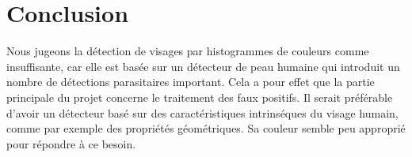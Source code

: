 \documentclass[a4paper,11pt]{article}
\begin{document}
\section{Conclusion}
Nous jugeons la détection de visages par histogrammes de couleurs comme insuffisante, car elle est basée sur un détecteur de peau humaine qui introduit un nombre de détections parasitaires important.
Cela a pour effet que la partie principale du projet concerne le traitement des faux positifs.
Il serait préférable d'avoir un détecteur basé sur des caractéristiques intrinséques du visage humain, comme par exemple des propriétés géométriques.
Sa couleur semble peu approprié pour répondre à ce besoin.
\end{document}
